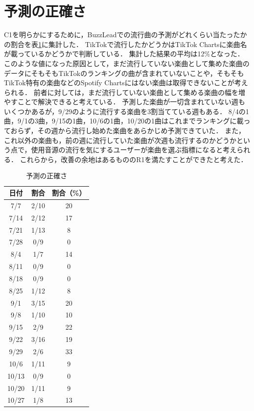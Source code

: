\documentclass[titlepage]{jsreport}
\begin{document}
\section{予測の正確さ}
C1を明らかにするために，BuzzLeadでの流行曲の予測がどれくらい当たったかの割合を表\ref{table:predict_accuracy}に集計した．
TikTokで流行したかどうかはTikTok Chartsに楽曲名が載っているかどうかで判断している．
集計した結果の平均は12\%となった．
このような値になった原因として，まだ流行していない楽曲として集めた楽曲のデータにそもそもTikTokのランキングの曲が含まれていないことや，そもそもTikTok特有の楽曲などのSpotify Chartsにはない楽曲は取得できないことが考えられる．
前者に対しては，まだ流行していない楽曲として集める楽曲の幅を増やすことで解決できると考えている．
予測した楽曲が一切含まれていない週もいくつかあるが，9/29のように流行する楽曲を3割当てている週もある．
8/4の1曲，9/1の3曲，9/15の1曲，10/6の1曲，10/20の1曲はこれまでランキングに載っておらず，その週から流行し始めた楽曲をあらかじめ予測できていた．
また，これ以外の楽曲も，前の週に流行していた楽曲が次週も流行するのかどうかという点で，使用音源の流行を気にするユーザーが楽曲を選ぶ指標になると考えられる．
これらから，改善の余地はあるもののR1を満たすことができたと考えた．
\begin{table}[hbt]
  \caption{予測の正確さ}
  \label{table:predict_accuracy}
  \centering
  \begin{tabular}{c c c}
    \hline
    日付  & 割合  & 割合（\%）\\
    \hline \hline
    7/7 & 2/10 & 20\\
    7/14 & 2/12 & 17\\
    7/21 & 1/13 & 8\\
    7/28 & 0/9 & 0\\
    8/4 & 1/7 & 14\\
    8/11 & 0/9 & 0\\
    8/18 & 0/9 & 0 \\
    8/25 & 1/12 & 8\\
    9/1 & 3/15 & 20\\
    9/8 & 1/10 & 10\\
    9/15 & 2/9 & 22\\
    9/22 & 3/16 & 19\\
    9/29 & 2/6 & 33 \\
    10/6 & 1/11 & 9\\
    10/13 & 0/9 & 0\\
    10/20 & 1/11 & 9\\
    10/27 & 1/8 & 13\\
    \hline
  \end{tabular}
\end{table}
\end{document}
